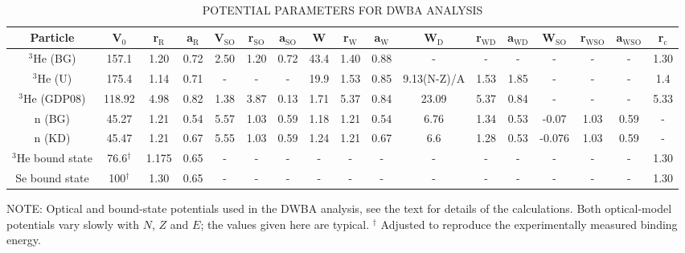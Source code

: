 \begin{table}\footnotesize
{}
\caption[\uppercase{potential parameters for DWBA analysis}]{\\\label{tab:typicalPotentials} \uppercase{potential parameters for DWBA analysis}}
\begin{tabular}{ccccccccccccccccc}\toprule
Particle & V$_0$ & r$_{\text{R}}$ & a$_{\text{R}}$ & V$_{\text{SO}}$ & r$_{\text{SO}}$ & a$_{\text{SO}}$ & W & r$_{\text{W}}$ & a$_{\text{W}}$ & W$_{\text{D}}$ & r$_{\text{WD}}$ & a$_{\text{WD}}$ & W$_{\text{SO}}$ & r$_{\text{WSO}}$ & a$_{\text{WSO}}$ & r$_{\text{c}}$ \\
\midrule
$^{3}$He (BG) & 157.1 & 1.20 & 0.72 & 2.50 & 1.20 & 0.72 & 43.4 & 1.40 & 0.88 & - & - & - & - & - & - & 1.30\\
$^{3}$He (U) & 175.4 & 1.14 & 0.71 & - & - & - & 19.9 & 1.53 & 0.85 & 9.13(N-Z)/A & 1.53 & 1.85 & - & - & - & 1.4\\
$^{3}$He (GDP08) & 118.92 & 4.98 & 0.82 & 1.38 & 3.87 & 0.13 & 1.71 & 5.37 & 0.84 & 23.09 & 5.37 & 0.84 & - & - & - & 5.33\\

n (BG) & 45.27 & 1.21 & 0.54 & 5.57 & 1.03 & 0.59 & 1.18 & 1.21 & 0.54 & 6.76 & 1.34 & 0.53 & -0.07 & 1.03 & 0.59 & -\\
n (KD) & 45.47 & 1.21 & 0.67 & 5.55 & 1.03 & 0.59 & 1.24 & 1.21 & 0.67 & 6.6 & 1.28 & 0.53 & -0.076 & 1.03 & 0.59 & -\\

$^3$He bound state & 76.6$^{\dagger}$ & 1.175 & 0.65 & - & - & - & - & - & - & - & - & - & - & - & - & 1.30\\

Se bound state & 100$^{\dagger}$ & 1.30 & 0.65 & - & - & - & - & - & - & - & - & - & - & - & - & 1.30\\
\bottomrule
\end{tabular}
\begin{flushleft}
\small NOTE:
Optical and bound-state potentials used in the DWBA analysis, see the text for details of the calculations. Both optical-model potentials vary slowly with $N$, $Z$ and $E$; the values given here are typical. $^{\dagger}$ Adjusted to reproduce the experimentally measured binding energy.
\end{flushleft}
\end{table}
